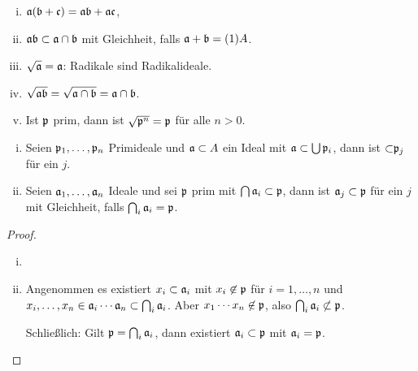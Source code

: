 \begin{nt}
    \begin{enumerate}[(i)]
        \item
            $\mathfrak{a} (\mathfrak{b}  + \mathfrak{c}) = \mathfrak{a} \mathfrak{b} + \mathfrak{a} \mathfrak{c}$,
        \item
            $\mathfrak{a} \mathfrak{b} \subset \mathfrak{a} \cap \mathfrak{b}$ mit Gleichheit, falls $\mathfrak{a} + \mathfrak{b} = (1) A$.
        \item
            $\sqrt{\mathfrak{a}} = \mathfrak{a}$: Radikale sind Radikalideale.
        \item
            $\sqrt{\mathfrak{a} \mathfrak{b}} = \sqrt{\mathfrak{a} \cap \mathfrak{b}} = \mathfrak{a} \cap \mathfrak{b}$.
        \item
            Ist $\mathfrak{p}$ prim, dann ist $\sqrt{{\mathfrak{p}}^n} = \mathfrak{p}$ für alle $n > 0$.
    \end{enumerate}
\end{nt}

\begin{st}
    \begin{enumerate}[(i)]
        \item
            Seien ${\mathfrak{p}}_1, \dotsc, {\mathfrak{p}}_n$ Primideale und $\mathfrak{a} \subset A$ ein Ideal mit $\mathfrak{a} \subset \bigcup {\mathfrak{p}}_i$, dann ist $\mathfrak{\subset} {\mathfrak{p}}_j$ für ein $j$.
        \item
            Seien ${\mathfrak{a}}_1, \dotsc, {\mathfrak{a}}_n$ Ideale und sei $\mathfrak{p}$ prim mit $\bigcap {\mathfrak{a}}_i \subset \mathfrak{p}$, dann ist ${\mathfrak{a}}_j \subset \mathfrak{p}$ für ein $j$ mit Gleichheit, falls $\bigcap_i {\mathfrak{a}_i} = \mathfrak{p}$.
    \end{enumerate}
    \begin{proof}
        \begin{enumerate}[(i)]
            \item
            \item
                Angenommen es existiert $x_i \subset {\mathfrak{a}}_i$ mit $x_i \not\in \mathfrak{p}$ für $i = 1,\dotsc, n$ und $x_i, \dotsc, x_n \in {\mathfrak{a}}_i \dotsb {\mathfrak{a}}_n \subset \bigcap_i {\mathfrak{a}}_i$.
                Aber $x_1 \dotsb x_n \not\in \mathfrak{p}$, also $\bigcap_i {\mathfrak{a}}_i \not\subset \mathfrak{p}$.

                Schließlich: Gilt $\mathfrak{p} = \bigcap_i {\mathfrak{a}}_i$, dann existiert ${\mathfrak{a}}_i \subset \mathfrak{p}$ mit ${\mathfrak{a}}_i = \mathfrak{p}$.
        \end{enumerate}
    \end{proof}
\end{st}

